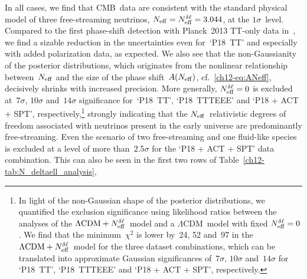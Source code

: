 In all cases, we find that CMB~data are consistent with the standard physical model of three free-streaming neutrinos, $N_\mathrm{eff} = N_\mathrm{eff}^{\delta\ell} = 3.044$, at the $1\sigma$~level. Compared to the first phase-shift detection with Planck~2013 TT-only data in~\cite{Follin:2015hya}, we find a sizable reduction in the uncertainties even for~`P18~TT' and especially with added polarization data, as expected. We also see that the non-Gaussianity of the posterior distributions, which originates from the nonlinear relationship between~$N_\mathrm{eff}$ and the size of the phase shift~$A(N_\mathrm{eff})$, cf.~\eqref{ch12-eq:ANeff}, decisively shrinks with increased precision. More generally, $N_\mathrm{eff}^{\delta\ell} = 0$ is excluded at~$7\sigma$, $10\sigma$ and~$14\sigma$ significance for~`P18~TT', `P18~TTTEEE' and `P18 + ACT + SPT', respectively,\footnote{In light of the non-Gaussian shape of the posterior distributions, we quantified the exclusion significance using likelihood ratios between the analyses of the $\Lambda\mathrm{CDM} + N_\mathrm{eff}^{\delta\ell}$~model and a $\Lambda\mathrm{CDM}$~model with fixed $N_\mathrm{eff}^{\delta\ell} = 0$. We find that the minimum~$\chi^2$ is lower by~24, 52 and~97 in the $\Lambda\mathrm{CDM} + N_\mathrm{eff}^{\delta\ell}$~model for the three dataset combinations, which can be translated into approximate Gaussian significances of~$7\sigma$, $10\sigma$ and~$14\sigma$ for `P18~TT', `P18~TTTEEE' and `P18 + ACT + SPT', respectively.\label{ch12-fn:significance}} strongly indicating that the $N_\mathrm{eff}$~relativistic degrees of freedom associated with neutrinos present in the early universe are predominantly free-streaming. Even the scenario of two free-streaming and one fluid-like species is excluded at a level of more than~$2.5\sigma$ for the `P18 + ACT + SPT' data combination. This can also be seen in the first two rows of Table~\ref{ch12-tab:N_deltaell_analysis},%
